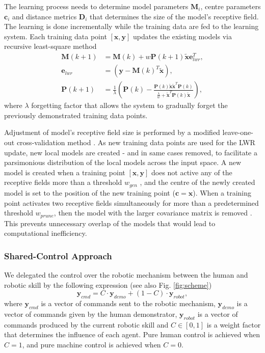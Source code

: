 The learning process needs to determine model parameters $\bm{M}_{i}$, centre parameters $\bm{c}_{i}$ and distance metrics $\bm{D}_{i}$ that determines the size of the model's receptive field. The learning is done incrementally while the training data are fed to the learning system. Each training data point $[\bm{x},\bm{y}]$ updates the existing models via  recursive least-square method \cite{Schaal1998}
\begin{align}
\bm{M}(k+1) &= \bm{M}(k) + w \bm{P}(k+1) \tilde{\bm{x}} \bm{e}_{lwr}^{T},\label{eq:lwr5} \\
\bm{e}_{lwr} &= (\bm{y}-\bm{M}(k)^{T}\tilde{\bm{x}}),\label{eq:lwr6} \\
\bm{P}(k+1) &= \frac{1}{\lambda}\left(\bm{P}(k)-\frac{\bm{P}(k)\tilde{\bm{x}}\tilde{\bm{x}}^{T}\bm{P}(k)}{\frac{\lambda}{w}+\tilde{\bm{x}}^{T}\bm{P}(k)\tilde{\bm{x}}}\right) ,\label{eq:lwr7}
\end{align}
where $\lambda$ forgetting factor that allows the system to gradually forget the previously demonstrated training data points.

Adjustment of model's receptive field size is performed by a modified leave-one-out cross-validation method \cite{Schaal1998}. As new training data points are used for the LWR update, new local models are created - and in same cases removed, to facilitate a parsimonious distribution of the local models across the input space. A new model is created when a training point $[\bm{x},\bm{y}]$ does not active any of the receptive fields more than a threshold $w_{gen}$ \cite{Schaal1998}, and the centre of the newly created model is set to the position of the new training point ($\bm{c}=\bm{x}$). When a training point activates two receptive fields simultaneously for more than a predetermined threshold $w_{prune}$, then the model with the larger covariance matrix is removed \cite{Schaal1998}. This prevents unnecessary overlap of the models that would lead to computational inefficiency.

\subsubsection{Shared-Control Approach}
We delegated the control over the robotic mechanism between the human and robotic skill by the following expression \cite{Peternel2013b} (see also Fig. \ref{fig:scheme})
\begin{equation}
\bm{y}_{cmd} = C \cdot \bm{y}_{demo} + (1-C) \cdot \bm{y}_{robot} ,
\label{eq:delegation}
\end{equation}
where $\bm{y}_{cmd}$ is a vector of commands sent to the robotic mechanism, $\bm{y}_{demo}$ is a vector of commands given by the human demonstrator, $\bm{y}_{robot}$ is a vector of commands produced by the current robotic skill and $C \in [0,1]$ is a weight factor that determines the influence of each agent. Pure human control is achieved when $C = 1$, and pure machine control is achieved when $C = 0$.

